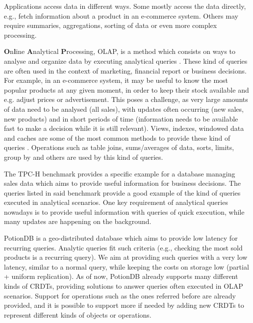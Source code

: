 Applications access data in different ways.
Some mostly access the data directly, e.g., fetch information about a product in an e-commerce system.
Others may require summaries, aggregations, sorting of data or even more complex processing.

\textbf{O}n\textbf{l}ine \textbf{A}nalytical \textbf{P}rocessing, OLAP, is a method which consists on ways to analyse and organize data by executing analytical queries \cite{dbtoaster, viewSelection, optIncMaintenance, effMaintenance}.
These kind of queries are often used in the context of marketing, financial report or business decisions.
For example, in an e-commerce system, it may be useful to know the most popular products at any given moment, in order to keep their stock available and e.g. adjust prices or advertisement.
This poses a challenge, as very large amounts of data need to be analysed (all sales), with updates often occurring (new sales, new products) and in short periods of time (information needs to be available fast to make a decision while it is still relevant).
Views, indexes, windowed data and caches are some of the most common methods to provide these kind of queries \cite{noria, dbtoaster, pequod, txcache, viewSelection, optIncMaintenance, effMaintenance}.
Operations such as table joins, sums/averages of data, sorts, limits, group by and others are used by this kind of queries. 

The TPC-H benchmark \cite{tpch, dbtoaster, partView, lazyMaintenance} provides a specific example for a database managing sales data which aims to provide useful information for business decisions.
The queries listed in said benchmark provide a good example of the kind of queries executed in analytical scenarios.
One key requirement of analytical queries nowadays is to provide useful information with queries of quick execution, while many updates are happening on the background.

PotionDB is a geo-distributed database which aims to provide low latency for recurring queries.
Analytic queries fit such criteria (e.g., checking the most sold products is a recurring query).
We aim at providing such queries with a very low latency, similar to a normal query, while keeping the costs on storage low (partial + uniform replication).
As of now, PotionDB already supports many different kinds of CRDTs, providing solutions to answer queries often executed in OLAP scenarios.
Support for operations such as the ones referred before are already provided, and it is possible to support more if needed by adding new CRDTs to represent different kinds of objects or operations.
 

